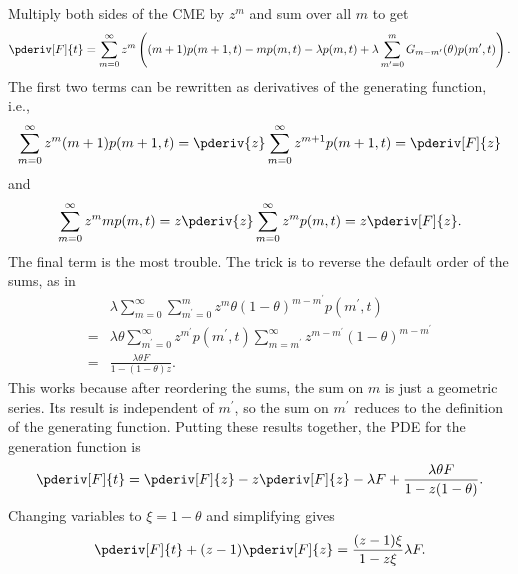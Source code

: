 Multiply both sides of the CME by $z^m$ and sum over all $m$ to get
\begin{align}
\pderiv[F]{t} = \sum_{m=0}^\infty z^m
\left(
(m+1)p(m+1,t) - m p(m,t) - \lambda p(m,t)
+ \lambda \sum_{m^\prime=0}^m G_{m-m^\prime}(\theta) p(m^\prime,t)
\right).
\end{align}
The first two terms can be rewritten as derivatives of the
generating function, i.e.,
\begin{align}
\sum_{m=0}^\infty z^m (m+1)p(m+1,t)
=
\pderiv{z} \sum_{m=0}^\infty z^{m+1} p(m+1,t)
=
\pderiv[F]{z}
\end{align}
and
\begin{align}
\sum_{m=0}^\infty z^m mp(m,t)
=
z\pderiv{z} \sum_{m=0}^\infty z^m p(m,t)
=
z\pderiv[F]{z}.
\end{align}
The final term is the most trouble. The trick is to reverse
the default order of the sums, as in
\begin{align}
&\lambda \sum_{m=0}^\infty \sum_{m^\prime=0}^m
        z^m \theta(1 - \theta)^{m-m^\prime} p(m^\prime,t)
\\=
&\lambda\theta \sum_{m^\prime=0}^\infty z^{m^\prime} p(m^\prime,t)
        \sum_{m=m^\prime}^\infty
        z^{m-m^\prime} (1 - \theta)^{m-m^\prime}
\\=
&\frac{\lambda\theta F}{1 - (1 - \theta)z}.
\end{align}
This works because after reordering the sums, the sum on $m$ is just
a geometric series. Its result is independent of $m^\prime$, so the sum on
$m^\prime$ reduces to the definition of the generating function.
Putting these results together, the PDE for the generation function is
\begin{align}
\pderiv[F]{t} = \pderiv[F]{z} - z\pderiv[F]{z} - \lambda F
        + \frac{\lambda\theta F}{1-z(1-\theta)}.
\end{align}
Changing variables to $\xi=1-\theta$ and simplifying gives
\begin{align}
\pderiv[F]{t} + (z - 1) \pderiv[F]{z} = \frac{(z-1)\xi}{1-z\xi}\lambda F.
\label{eq:1state_unreg_015}
\end{align}
